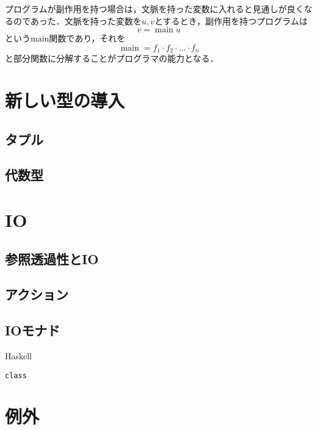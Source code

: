 \documentclass[a4paper,draft]{jsbook}
\newcommand{\programminglanguage}[1]{\textsf{#1}}
\newcommand{\haskell}{\programminglanguage{Haskell}}
\newenvironment{haskellcode}{\begin{itembox}[r]{\haskell}}{\end{itembox}}
\DeclareMathOperator{\mathMain}{main}
\newcommand{\mathGeneralMap}{\mathbin{\cdot}}
\begin{document}
プログラムが副作用を持つ場合は，文脈を持った変数に入れると見通しが良くなるのであった．文脈を持った変数を$u,v$とするとき，副作用を持つプログラムは
\begin{equation}
v=\mathMain u
\end{equation}
という$\text{main}$関数であり，それを
\begin{equation}
\mathMain=f_1\mathGeneralMap f_2\mathGeneralMap\dots\mathGeneralMap f_n
\end{equation}
と部分関数に分解することがプログラマの能力となる．

\chapter{新しい型の導入}

\section{タプル}

\section{代数型}




\chapter{IO}

\section{参照透過性とIO}

\section{アクション}

\section{IOモナド}

\begin{haskellcode}
\begin{verbatim}
class
\end{verbatim}
\end{haskellcode}


\chapter{例外}
\end{document}
